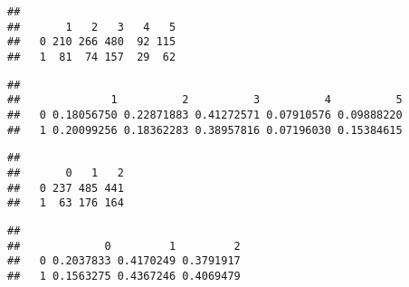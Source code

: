 \documentclass[
  10pt,
]{book}
\newenvironment{Shaded}{\begin{snugshade}}{\end{snugshade}}
\newcommand{\DecValTok}[1]{\textcolor[rgb]{0.00,0.00,0.81}{#1}}
\newcommand{\KeywordTok}[1]{\textcolor[rgb]{0.13,0.29,0.53}{\textbf{#1}}}
\newcommand{\NormalTok}[1]{#1}
\newcommand{\OperatorTok}[1]{\textcolor[rgb]{0.81,0.36,0.00}{\textbf{#1}}}
\begin{document}
\begin{Shaded}
\end{Shaded}

\begin{verbatim}
##    
##       1   2   3   4   5
##   0 210 266 480  92 115
##   1  81  74 157  29  62
\end{verbatim}

\begin{Shaded}
\end{Shaded}

\begin{verbatim}
##    
##              1          2          3          4          5
##   0 0.18056750 0.22871883 0.41272571 0.07910576 0.09888220
##   1 0.20099256 0.18362283 0.38957816 0.07196030 0.15384615
\end{verbatim}

\begin{Shaded}
\end{Shaded}

\begin{verbatim}
##    
##       0   1   2
##   0 237 485 441
##   1  63 176 164
\end{verbatim}

\begin{Shaded}
\end{Shaded}

\begin{verbatim}
##    
##             0         1         2
##   0 0.2037833 0.4170249 0.3791917
##   1 0.1563275 0.4367246 0.4069479
\end{verbatim}
\end{document}
